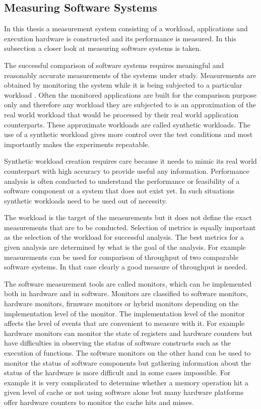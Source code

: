 \subsection{Measuring Software Systems}
\label{subsec:measuring-software}
In this thesis a measurement system consisting of a workload, applications and execution hardware is constructed and its performance is measured. In this subsection a closer look at measuring software systems is taken.

The successful comparison of software systems requires meaningful and reasonably accurate measurements of the systems under study. Measurements are obtained by monitoring the system while it is being subjected to a particular workload \cite{jain1991art}. Often the monitored applications are built for the comparison purpose only and therefore any workload they are subjected to is an approximation of the real world workload that would be processed by their real world application counterparts. These approximate workloads are called synthetic workloads. The use of a synthetic workload gives more control over the test conditions and most importantly makes the experiments repeatable.~\cite{jain1991art}

Synthetic workload creation requires care because it needs to mimic its real world counterpart with high accuracy to provide useful any information. Performance analysis is often conducted to understand the performance or feasibility of a software component or a system that does not exist yet. In such situations synthetic workloads need to be used out of necessity.  

The workload is the target of the measurements but it does not define the exact measurements that are to be conducted. Selection of metrics is equally important as the selection of the workload for successful analysis. The best metrics for a given analysis are determined by what is the goal of the analysis. \cite{jain1991art} For example measurements can be used for comparison of throughput of two comparable software systems. In that case clearly a good measure of throughput is needed.

The software measurement tools are called monitors, which can be implemented both in hardware and in software. Monitors are classified to software monitors, hardware monitors, firmware monitors or hybrid monitors depending on the implementation level of the monitor. The implementation level of the monitor affects the level of events that are convenient to measure with it. For example hardware monitors can monitor the state of registers and hardware counters but have difficulties in observing the status of software constructs such as the execution of functions. The software monitors on the other hand can be used to monitor the status of software components but gathering information about the status of the hardware is more difficult and in some cases impossible. \cite{jain1991art} For example it is very complicated to determine whether a memory operation hit a given level of cache or not using software alone but many hardware platforms offer hardware counters to monitor the cache hits and misses.

